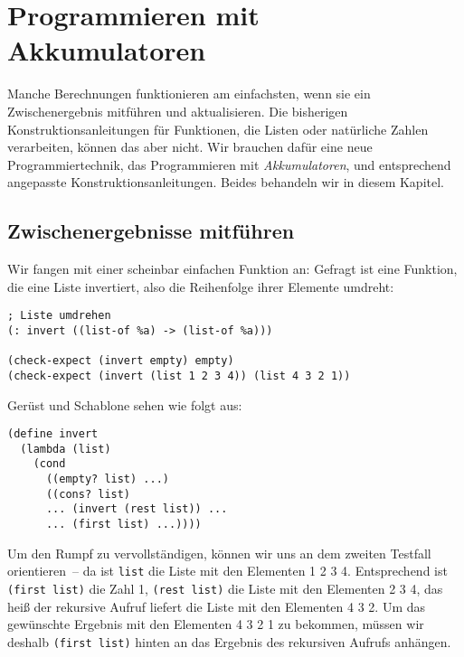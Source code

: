 
\chapter{Programmieren mit Akkumulatoren}
\label{cha:accu}

Manche Berechnungen funktionieren am einfachsten, wenn sie ein
Zwischenergebnis mitführen und aktualisieren.  Die bisherigen
Konstruktionsanleitungen für Funktionen, die Listen oder natürliche
Zahlen verarbeiten, können das aber nicht.  Wir brauchen dafür eine
neue Programmiertechnik, das Programmieren mit
\textit{Akkumulatoren}, und entsprechend angepasste
Konstruktionsanleitungen.  Beides behandeln wir in diesem Kapitel.

\section{Zwischenergebnisse mitführen}
\label{sec:intermediate-results}

Wir fangen mit einer scheinbar einfachen Funktion an: Gefragt ist eine
Funktion, die eine Liste invertiert, also die Reihenfolge ihrer
Elemente umdreht:\label{sec:invert}
%
\begin{lstlisting}
; Liste umdrehen
(: invert ((list-of %a) -> (list-of %a)))

(check-expect (invert empty) empty)
(check-expect (invert (list 1 2 3 4)) (list 4 3 2 1))
\end{lstlisting}
%
Gerüst und Schablone sehen wie folgt aus:
%
\begin{lstlisting}
(define invert
  (lambda (list)
    (cond
      ((empty? list) ...)
      ((cons? list)
      ... (invert (rest list)) ...
      ... (first list) ...))))
\end{lstlisting}
%
Um den Rumpf zu vervollständigen, können wir uns an dem zweiten
Testfall orientieren~-- da ist \lstinline{list} die Liste mit den
Elementen 1 2 3 4.  Entsprechend ist \lstinline{(first list)} die
Zahl 1, \lstinline{(rest list)} die Liste mit den Elementen 2 3 4, das
heiß der rekursive Aufruf liefert die Liste mit den Elementen 4 3 2.
Um das gewünschte Ergebnis mit den Elementen 4 3 2 1 zu bekommen,
müssen wir deshalb \lstinline{(first list)} hinten an das Ergebnis des
rekursiven Aufrufs anhängen.

